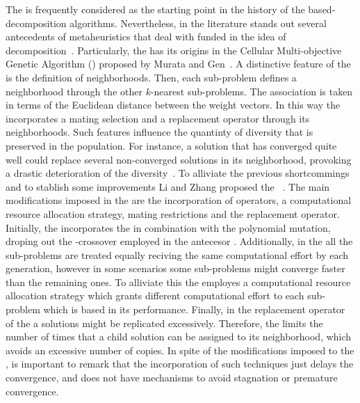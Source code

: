 The \MOEAD{} is frequently considered as the starting point in the history of the based-decomposition algorithms.
%
Nevertheless, in the literature stands out several antecedents of metaheuristics that deal with \MOPS{} funded in the idea of decomposition~\cite{ishibuchi1998multi, murata2002cellular}.
%
Particularly, the \MOEAD{} has its origins in the Cellular Multi-objective Genetic Algorithm (\CMOEA{}) proposed by Murata and Gen~\cite{murata2002cellular}.
%
A distinctive feature of the \MOEAD{} is the definition of neighborhoods.
%
Then, each sub-problem defines a neighborhood through the other $k$-nearest sub-problems.
%
The association is taken in terms of the Euclidean distance between the weight vectors.
%
In this way the \MOEAD{} incorporates a mating selection and a replacement operator through its neighborhoods.
%
Such features influence the quantinty of diversity that is preserved in the population.
%
For instance, a solution that has converged quite well could replace several non-converged solutions in its neighborhood, provoking a drastic deterioration of the diversity~\cite{wang2015constrained}.
%
To alliviate the previous shortcommings and to stablish some improvements Li and Zhang proposed the \MOEADDE{}~\cite{li2009multiobjective}.
%
The main modifications imposed in the \MOEADDE{} are the incorporation of \DE{} operators, a computational resource allocation strategy, mating restrictions and the replacement operator.
%
Initially, the \MOEADDE{} incorporates the \DE{} in combination with the polynomial mutation, droping out the \SBX{}-crossover  employed in the antecesor \MOEAD{}.
%
Additionally, in the \MOEAD{} all the sub-problems are treated equally reciving the same computational effort by each generation, however in some scenarios some sub-problems might converge faster than the remaining ones.
%
To alliviate this the \MOEADDE{} employes a computational resource allocation strategy which grants different computational effort to each sub-problem which is based in its performance.
%
Finally, in the replacement operator of the \MOEAD{} a solutions might be replicated excessively.
%
Therefore, the \MOEADDE{} limits the number of times that a child solution can be assigned to its neighborhood, which avoids an excessive number of copies.
%
In spite of the modifications imposed to the \MOEADDE{}, is important to remark that the incorporation of such techniques just delays the convergence, and does not have mechanisms to avoid stagnation or premature convergence.
%
